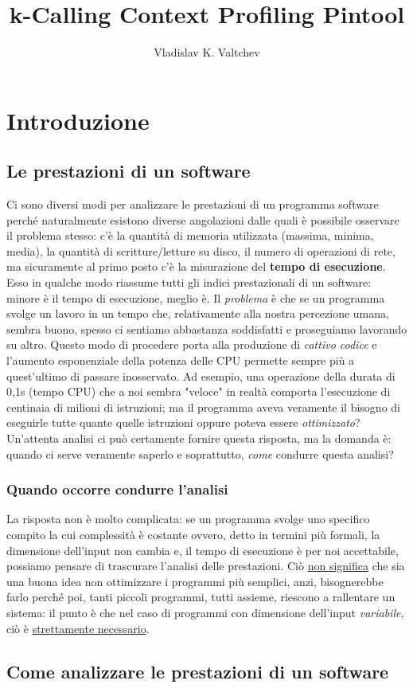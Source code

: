 \documentclass[a4paper,11pt]{report}
\author{Vladislav K. Valtchev}
\title{k-Calling Context Profiling Pintool}
\begin{document}
\maketitle

\chapter{Introduzione}
\section{Le prestazioni di un software}

Ci sono diversi modi per analizzare le prestazioni di un programma software perché naturalmente
esistono diverse angolazioni dalle quali è possibile osservare il problema stesso: 
c'è la quantità di memoria utilizzata (massima, minima, media), la quantità 
di scritture/letture su disco, il numero di operazioni di rete, ma sicuramente
al primo posto c'è la misurazione del \textbf{tempo di esecuzione}. 
Esso in qualche modo riassume tutti gli indici prestazionali di un software: 
minore è il tempo di esecuzione, meglio è.
Il \textit{problema} è che se un programma svolge un lavoro in un tempo che, relativamente alla nostra percezione umana, sembra buono, spesso ci sentiamo abbastanza soddisfatti e proseguiamo lavorando su altro.
Questo modo di procedere porta alla produzione di \textit{cattivo codice} e l'aumento esponenziale della potenza delle CPU permette sempre più a quest'ultimo di passare 
inosservato. Ad esempio, una operazione della durata di 0,1s (tempo CPU) che a noi sembra "veloce" 
in realtà comporta l'esecuzione di centinaia di milioni di istruzioni; ma il programma aveva 
veramente il bisogno di eseguirle tutte quante quelle istruzioni oppure poteva essere \textit{ottimizzato}? Un'attenta analisi ci può certamente fornire questa risposta, ma la domanda è: quando ci serve veramente saperlo e soprattutto, \textit{come} condurre questa analisi?  

\subsection{Quando occorre condurre l'analisi}

La risposta non è molto complicata: se un programma svolge uno specifico compito la cui complessità è costante ovvero, detto in termini più formali, la dimensione dell'input non cambia e, il tempo di esecuzione è per noi accettabile, possiamo pensare di trascurare l'analisi delle prestazioni.
Ciò \underline{non significa} che sia una buona idea non ottimizzare i programmi più semplici, anzi, bisognerebbe farlo perché poi, tanti piccoli programmi, tutti assieme, riescono a rallentare un sistema: il punto è che nel caso di programmi con dimensione dell'input \textit{variabile}, ciò è \underline{strettamente necessario}.

\section{Come analizzare le prestazioni di un software}
\end{document}
